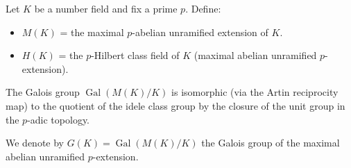 Let $K$ be a number field and fix a prime $p$. Define:
\begin{itemize}
\item $M(K)$ = the maximal $p$-abelian unramified extension of $K$.
\item $H(K)$ = the $p$-Hilbert class field of $K$ (maximal abelian unramified $p$-extension).
\end{itemize}
The Galois group $\operatorname{Gal}(M(K)/K)$ is isomorphic (via the Artin reciprocity map) to the quotient of the idele class group by the closure of the unit group in the $p$-adic topology.

We denote by $G(K) = \operatorname{Gal}(M(K)/K)$ the Galois group of the maximal abelian unramified $p$-extension.
